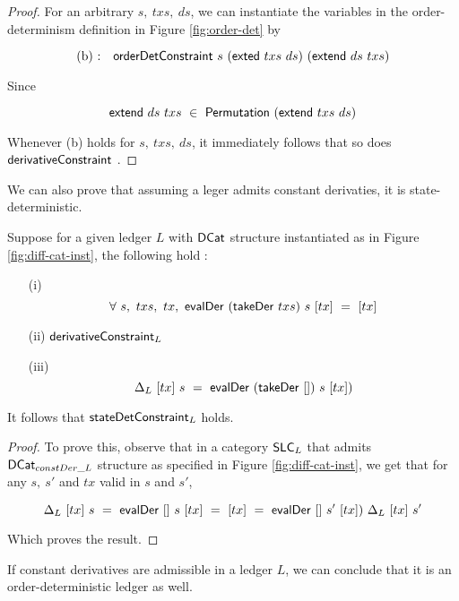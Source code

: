 \begin{proof}
  For an arbitrary $s,~txs,~ds$, we can instantiate the variables in the
  order-determinism definition in Figure \ref{fig:order-det} by

  \[ \text{(b)~:~~~}\mathsf{orderDetConstraint}~s~(\mathsf{exted}~txs~ds)~(\mathsf{extend}~ds~txs) \]

  Since

  \[ \mathsf{extend}~ds~txs~\in~\mathsf{Permutation}~(\mathsf{extend}~txs~ds) \]

  Whenever (b) holds for $s,~txs,~ds$, it immediately follows that so does $\mathsf{derivativeConstraint}$ .
\end{proof}

We can also prove that assuming a leger admits constant derivaties, it is
state-deterministic.

\begin{theorem}
\label{the:state-det}
  Suppose for a given ledger $L$ with $\mathsf{DCat}$ structure instantiated as in
  Figure \ref{fig:diff-cat-inst}, the following hold :

  \begin{itemize}
    \item[(i)] \[ \forall~s,~txs,~tx,~\mathsf{evalDer} ~(\mathsf{takeDer}~ txs) ~s~ [tx]~=~[tx] \]
    \item[(ii)] $\mathsf{derivativeConstraint}_L$
    \item[(iii)] \[ \Delta_L~[tx]~s~=~\mathsf{evalDer} ~(\mathsf{takeDer}~ []) ~s~ [tx]) \]
  \end{itemize}

  It follows that $\mathsf{stateDetConstraint}_L$ holds.

\end{theorem}

\begin{proof}
  To prove this, observe that in a category $\mathsf{SLC}_L$ that admits $\mathsf{DCat}_{constDer\_L}$ structure
  as specified in Figure \ref{fig:diff-cat-inst}, we get that for any $s,~s'$ and $tx$
  valid in $s$ and $s'$,

  \[ \Delta_L~[tx]~s~=~\mathsf{evalDer} ~[] ~s~ [tx]~=~[tx]~=~\mathsf{evalDer} ~[] ~s'~ [tx])~\Delta_L~[tx]~s' \]

  Which proves the result.

\end{proof}






If constant derivatives are admissible in a ledger $L$, we can conclude that
it is an order-deterministic ledger as well.

